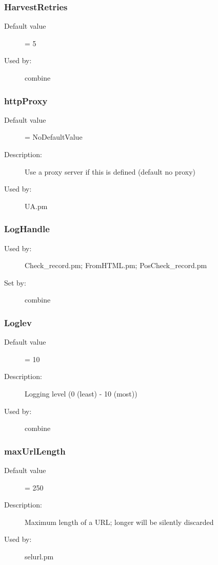 \subsubsection{HarvestRetries}
\label{HarvestRetries}
\begin{description}
\item[Default value] = 5
\item[Used by:] combine
\end{description}
\subsubsection{httpProxy}
\label{httpProxy}
\begin{description}
\item[Default value] = NoDefaultValue
\item[Description:] Use a proxy server if this is defined (default no proxy)
\item[Used by:] UA.pm
\end{description}
\subsubsection{LogHandle}
\label{LogHandle}
\begin{description}
\item[Used by:] Check\_record.pm; FromHTML.pm; PosCheck\_record.pm
\item[Set by:] combine
\end{description}
\subsubsection{Loglev}
\label{Loglev}
\begin{description}
\item[Default value] = 10
\item[Description:] Logging level (0 (least) - 10 (most))
\item[Used by:] combine
\end{description}
\subsubsection{maxUrlLength}
\label{maxUrlLength}
\begin{description}
\item[Default value] = 250
\item[Description:] Maximum length of a URL; longer will be silently discarded
\item[Used by:] selurl.pm
\end{description}
